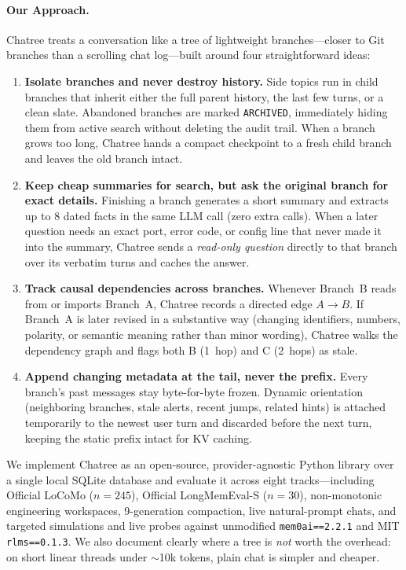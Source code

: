 \documentclass[10pt,twocolumn]{article}
\begin{document}
\paragraph{Our Approach.}
Chatree treats a conversation like a tree of lightweight branches—closer to Git branches than a scrolling chat log—built around four straightforward ideas:
\begin{enumerate}
  \item \textbf{Isolate branches and never destroy history.} Side topics run in child branches that inherit either the full parent history, the last few turns, or a clean slate. Abandoned branches are marked \texttt{ARCHIVED}, immediately hiding them from active search without deleting the audit trail. When a branch grows too long, Chatree hands a compact checkpoint to a fresh child branch and leaves the old branch intact.
  \item \textbf{Keep cheap summaries for search, but ask the original branch for exact details.} Finishing a branch generates a short summary and extracts up to 8 dated facts in the same LLM call (zero extra calls). When a later question needs an exact port, error code, or config line that never made it into the summary, Chatree sends a \emph{read-only question} directly to that branch over its verbatim turns and caches the answer.
  \item \textbf{Track causal dependencies across branches.} Whenever Branch~B reads from or imports Branch~A, Chatree records a directed edge $A \to B$. If Branch~A is later revised in a substantive way (changing identifiers, numbers, polarity, or semantic meaning rather than minor wording), Chatree walks the dependency graph and flags both B (1~hop) and C (2~hops) as stale.
  \item \textbf{Append changing metadata at the tail, never the prefix.} Every branch's past messages stay byte-for-byte frozen. Dynamic orientation (neighboring branches, stale alerts, recent jumps, related hints) is attached temporarily to the newest user turn and discarded before the next turn, keeping the static prefix intact for KV caching.
\end{enumerate}

We implement Chatree as an open-source, provider-agnostic Python library over a single local SQLite database and evaluate it across eight tracks—including Official LoCoMo ($n=245$), Official LongMemEval-S ($n=30$), non-monotonic engineering workspaces, 9-generation compaction, live natural-prompt chats, and targeted simulations and live probes against unmodified \texttt{mem0ai==2.2.1} and MIT \texttt{rlms==0.1.3}. We also document clearly where a tree is \emph{not} worth the overhead: on short linear threads under $\sim$10k tokens, plain chat is simpler and cheaper.
\end{document}
